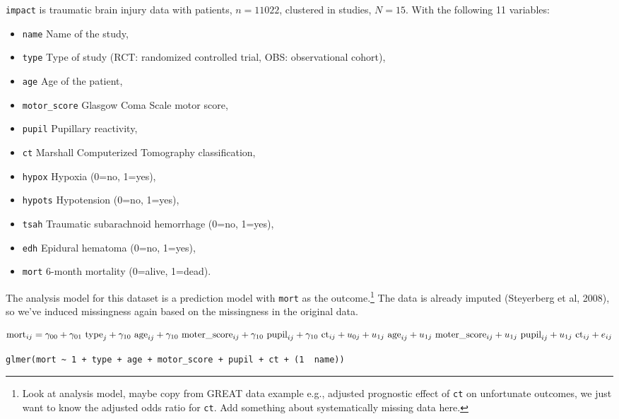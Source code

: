 \documentclass[
]{jss}
\providecommand{\tightlist}{%
  \setlength{\itemsep}{0pt}\setlength{\parskip}{0pt}}
\begin{document}
\texttt{impact} is traumatic brain injury data with patients,
\(n = 11022\), clustered in studies, \(N = 15\). With the following 11
variables:

\begin{itemize}
\tightlist
\item
  \texttt{name} Name of the study,
\item
  \texttt{type} Type of study (RCT: randomized controlled trial, OBS:
  observational cohort),
\item
  \texttt{age} Age of the patient,
\item
  \texttt{motor\_score} Glasgow Coma Scale motor score,
\item
  \texttt{pupil} Pupillary reactivity,
\item
  \texttt{ct} Marshall Computerized Tomography classification,
\item
  \texttt{hypox} Hypoxia (0=no, 1=yes),
\item
  \texttt{hypots} Hypotension (0=no, 1=yes),
\item
  \texttt{tsah} Traumatic subarachnoid hemorrhage (0=no, 1=yes),
\item
  \texttt{edh} Epidural hematoma (0=no, 1=yes),
\item
  \texttt{mort} 6-month mortality (0=alive, 1=dead).
\end{itemize}

The analysis model for this dataset is a prediction model with
\texttt{mort} as the outcome.\footnote{Look at analysis model, maybe
  copy from GREAT data example e.g., adjusted prognostic effect of
  \texttt{ct} on unfortunate outcomes, we just want to know the adjusted
  odds ratio for \texttt{ct}. Add something about systematically missing
  data here.} The data is already imputed (Steyerberg et al, 2008), so
we've induced missingness again based on the missingness in the original
data.

\[
\text{mort}_{ij} =
\gamma_{00} + 
\gamma_{01} \text{ type}_{j} + 
\gamma_{10} \text{ age}_{ij} + 
\gamma_{10} \text{ moter\_score}_{ij} + 
\gamma_{10} \text{ pupil}_{ij} + 
\gamma_{10} \text{ ct}_{ij} + \\
u_{0j} + 
u_{1j} \text{ age}_{ij} + 
u_{1j} \text{ moter\_score}_{ij} +  
u_{1j} \text{ pupil}_{ij} +  
u_{1j} \text{ ct}_{ij} +  
e_{ij} \\
\]

\texttt{glmer(mort\ \textasciitilde{}\ 1\ +\ type\ +\ age\ +\ motor\_score\ +\ pupil\ +\ ct\ +\ (1\ \textbar{}\ name))}
\end{document}
